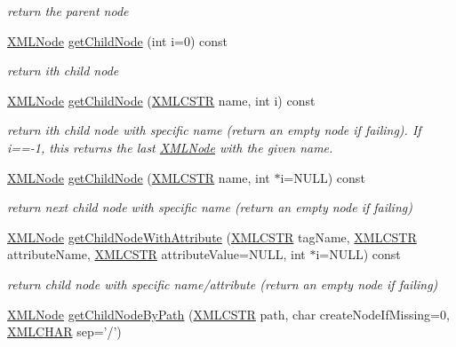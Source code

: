 \begin{DoxyCompactItemize}
\begin{DoxyCompactList}\small\item\em return the parent node \end{DoxyCompactList}\item 
\hyperlink{structXMLNode}{X\-M\-L\-Node} \hyperlink{group__navigate_ga77a21438b6d48a52cf8a1270f82f4475}{get\-Child\-Node} (int i=0) const 
\begin{DoxyCompactList}\small\item\em return ith child node \end{DoxyCompactList}\item 
\hyperlink{structXMLNode}{X\-M\-L\-Node} \hyperlink{group__navigate_gaf46d002a855acb46c18e47b70e686808}{get\-Child\-Node} (\hyperlink{xmlParser_8h_acdb0d6fd8dd596384b438d86cfb2b182}{X\-M\-L\-C\-S\-T\-R} name, int i) const 
\begin{DoxyCompactList}\small\item\em return ith child node with specific name (return an empty node if failing). If i==-\/1, this returns the last \hyperlink{structXMLNode}{X\-M\-L\-Node} with the given name. \end{DoxyCompactList}\item 
\hyperlink{structXMLNode}{X\-M\-L\-Node} \hyperlink{group__navigate_gac2e8c96fc51b59b6667ee02785cb6943}{get\-Child\-Node} (\hyperlink{xmlParser_8h_acdb0d6fd8dd596384b438d86cfb2b182}{X\-M\-L\-C\-S\-T\-R} name, int $\ast$i=N\-U\-L\-L) const 
\begin{DoxyCompactList}\small\item\em return next child node with specific name (return an empty node if failing) \end{DoxyCompactList}\item 
\hyperlink{structXMLNode}{X\-M\-L\-Node} \hyperlink{group__navigate_ga5d2775ee0704a2c028d76d267db7960a}{get\-Child\-Node\-With\-Attribute} (\hyperlink{xmlParser_8h_acdb0d6fd8dd596384b438d86cfb2b182}{X\-M\-L\-C\-S\-T\-R} tag\-Name, \hyperlink{xmlParser_8h_acdb0d6fd8dd596384b438d86cfb2b182}{X\-M\-L\-C\-S\-T\-R} attribute\-Name, \hyperlink{xmlParser_8h_acdb0d6fd8dd596384b438d86cfb2b182}{X\-M\-L\-C\-S\-T\-R} attribute\-Value=N\-U\-L\-L, int $\ast$i=N\-U\-L\-L) const 
\begin{DoxyCompactList}\small\item\em return child node with specific name/attribute (return an empty node if failing) \end{DoxyCompactList}\item 
\hyperlink{structXMLNode}{X\-M\-L\-Node} \hyperlink{group__navigate_ga18176d2a9e4830dcb1bca62f9c664b15}{get\-Child\-Node\-By\-Path} (\hyperlink{xmlParser_8h_acdb0d6fd8dd596384b438d86cfb2b182}{X\-M\-L\-C\-S\-T\-R} path, char create\-Node\-If\-Missing=0, \hyperlink{xmlParser_8h_a9f587fbd233e721e8818a3bf8102838f}{X\-M\-L\-C\-H\-A\-R} sep='/')

\end{DoxyCompactItemize}
